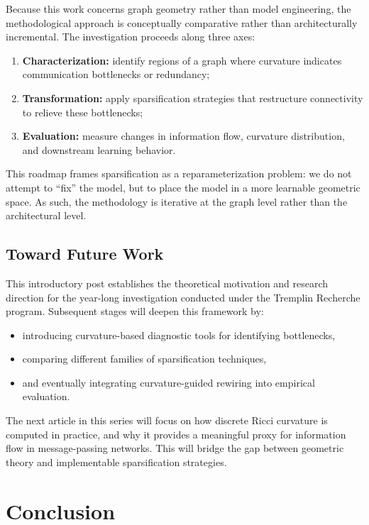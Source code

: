 \documentclass[letterpaper,12pt]{article}
\begin{document}
Because this work concerns graph geometry rather than model engineering, the methodological approach is conceptually comparative rather than architecturally incremental. The investigation proceeds along three axes:
\begin{enumerate}
    \item \textbf{Characterization:} identify regions of a graph where curvature indicates communication bottlenecks or redundancy;
    \item \textbf{Transformation:} apply sparsification strategies that restructure connectivity to relieve these bottlenecks;
    \item \textbf{Evaluation:} measure changes in information flow, curvature distribution, and downstream learning behavior.
\end{enumerate}

This roadmap frames sparsification as a reparameterization problem: we do not attempt to “fix” the model, but to place the model in a more learnable geometric space. As such, the methodology is iterative at the graph level rather than the architectural level.

\subsection{Toward Future Work}

This introductory post establishes the theoretical motivation and research direction for the year-long investigation conducted under the Tremplin Recherche program. Subsequent stages will deepen this framework by:
\begin{itemize}
    \item introducing curvature-based diagnostic tools for identifying bottlenecks,
    \item comparing different families of sparsification techniques,
    \item and eventually integrating curvature-guided rewiring into empirical evaluation.
\end{itemize}

The next article in this series will focus on how discrete Ricci curvature is computed in practice, and why it provides a meaningful proxy for information flow in message-passing networks. This will bridge the gap between geometric theory and implementable sparsification strategies.

\section{Conclusion}
\end{document}
